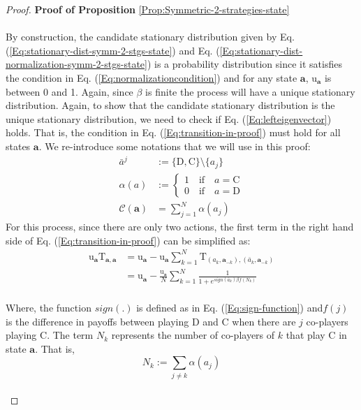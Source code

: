 \documentclass[11pt]{article}
\theoremstyle{plainCl1}
\theoremstyle{plainCl2}
\newcommand{\abf}{\mathbf{a}}
\newcommand{\C}{\mathrm{C}}
\newcommand{\D}{\mathrm{D}}
\begin{document}
\begin{proof}
\textbf{Proof of Proposition} \ref{Prop:Symmetric-2-strategies-state} \\ \\
By construction, the candidate stationary distribution given by Eq. (\ref{Eq:stationary-dist-symm-2-stgs-state}) and Eq. (\ref{Eq:stationary-dist-normalization-symm-2-stgs-state}) is a probability distribution since it satisfies the condition in Eq. (\ref{Eq:normalizationcondition}) and for any state $\abf$, $\mathrm{u}_{\abf}$ is between 0 and 1.  Again, since $\beta$ is finite the process will have a unique stationary distribution. Again, to show that the candidate stationary distribution is the unique stationary distribution, we need to check if Eq. (\ref{Eq:lefteigenvector}) holds. That is, the condition in Eq. (\ref{Eq:transition-in-proof}) must hold for all states $\abf$. We re-introduce some notations that we will use in this proof: 
\begin{align}
\bar{a}^j &:= \{\D,\C\} \setminus \{a_j\} \\[10pt]
\alpha(a)&:= 
\begin{cases}
1 \quad \text{if} \quad a = \C \\[10pt]
0 \quad \text{if} \quad a = \D 
\end{cases}\\[10pt]
\mathcal{C}(\abf) &= \sum_{j=1}^N \alpha(a_j)
\end{align}
For this process, since there are only two actions, the first term in the right hand side of Eq. (\ref{Eq:transition-in-proof}) can be simplified as: 
\begin{align}
\mathrm{u}_{\abf} \mathrm{T}_{\abf,\abf}  &= \mathrm{u}_\abf - \mathrm{u}_{\abf} \sum_{k=1}^{N} \mathrm{T}_{(a_k, \abf_{-k}),(\bar{a}_{k}, \abf_{-k})} \\[10pt]
&= \mathrm{u}_{\abf} - \frac{\mathrm{u}_{\abf}}{N} \sum_{k=1}^N \frac{1}{1 + \displaystyle e^{\mathit{sign}(\bar{a}_{k}) \beta f(N_k)}}
\label{Eq:T_aa_u_a term}
\end{align}
\\ \noindent Where, the function $\mathit{sign}(.)$ is  defined as in Eq. (\ref{Eq:sign-function}) and$f(j)$ is the difference in payoffs between playing $\D$ and $\C$ when there are $j$ co-players playing $\C$. The term $N_k$ represents the number of co-players of $k$ that play $\C$ in state $\abf$. That is,
\begin{equation}
N_k := \sum_{j \neq k} \alpha(a_j)
\end{equation} \\

\end{proof}
\end{document}
